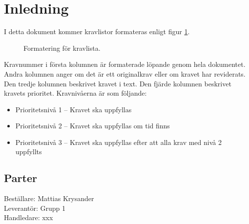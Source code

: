 \documentclass[a4paper,11pt]{article}
\newcommand{\LIPSprojektgrupp}{Grupp 1}
\begin{document}
\pagestyle{intro}
\LIPStitelsida
\clearpage
\begin{LIPSprojektidentitet}
\end{LIPSprojektidentitet}
\clearpage
\renewcommand{\familydefault}{\sfdefault}	%
\normalfont
\tableofcontents
\renewcommand{\familydefault}{\rmdefault}	%
\normalfont
\clearpage
\begin{LIPSdokumenthistorik}
\end{LIPSdokumenthistorik}
\clearpage
\setcounter{page}{1}
\pagestyle{content}
\section{Inledning}


I detta dokument kommer kravlistor formateras enligt figur \ref{fig:lipskrav_exempel}.
\begin{figure}[h!]
\begin{LIPSkravlista}
\end{LIPSkravlista}
\caption{Formatering för kravlista.}
\label{fig:lipskrav_exempel}
\end{figure}

Kravnummer i första kolumnen är formaterade löpande genom hela dokumentet. Andra kolumnen anger om det är ett originalkrav eller om kravet har reviderats. Den tredje kolumnen beskrivet kravet i text. Den fjärde kolumnen beskrivet kravets prioritet. Kravnivåerna är som följande:
\begin{itemize}
    \item Prioritetsnivå 1 – Kravet ska uppfyllas
    \item Prioritetsnivå 2 – Kravet ska uppfyllas om tid finns
    \item Prioritetsnivå 3 – Kravet ska uppfyllas efter att alla krav med nivå 2 uppfyllts 
\end{itemize}
\subsection{Parter}
Beställare: Mattias Krysander \\
Leverantör: \LIPSprojektgrupp \\
Handledare: xxx 
\end{document}
